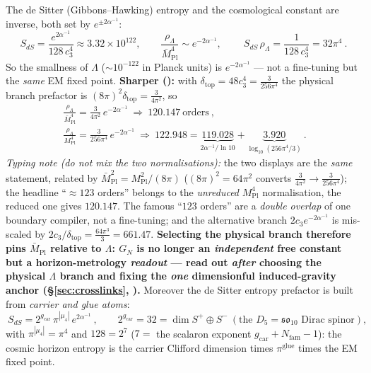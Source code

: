 \documentclass[11pt,a4paper]{article}
\newcommand{\cthree}{c_3}
\newcommand{\gcar}{g_{\mathrm{car}}}
\newcommand{\Nfam}{N_{\mathrm{fam}}}
\newcommand{\ainv}{\alpha^{-1}}
\begin{document}
\begin{keybox}
The de Sitter (Gibbons--Hawking) entropy and the cosmological constant are inverse, both set by
$e^{\pm2\ainv}$:
\[
  S_{dS}=\frac{e^{2\ainv}}{128\,\cthree^4}\approx3.32\times10^{122},\qquad
  \frac{\rho_\Lambda}{\bar M_{\mathrm{Pl}}^4}\sim e^{-2\ainv},\qquad
  \boxed{\ S_{dS}\,\rho_\Lambda=\frac{1}{128\,\cthree^4}=32\pi^4\ }.
\]
So the smallness of $\Lambda$ ($\sim10^{-122}$ in Planck units) is $e^{-2\ainv}$ --- not a fine-tuning but
the \emph{same} EM fixed point. \textbf{Sharper ():} with
$\delta_{\mathrm{top}}=48\cthree^4=\tfrac{3}{256\pi^4}$ the physical branch prefactor is
$(8\pi)^2\delta_{\mathrm{top}}=\tfrac{3}{4\pi^2}$, so
\begin{gather*}
  \boxed{\ \frac{\rho_\Lambda}{\bar M_{\mathrm{Pl}}^4}=\frac{3}{4\pi^2}\,e^{-2\ainv}\ \Rightarrow\ 120.147\ \text{orders}\ },\\[2pt]
  \boxed{\ \frac{\rho_\Lambda}{M_{\mathrm{Pl}}^4}=\frac{3}{256\pi^4}\,e^{-2\ainv}\ \Rightarrow\
  122.948=\underbrace{119.028}_{2\ainv/\ln10}+\underbrace{3.920}_{\log_{10}(256\pi^4/3)}\ }.
\end{gather*}
\emph{Typing note (do not mix the two normalisations):} the two displays are the \emph{same} statement,
related by $\bar M_{\mathrm{Pl}}^2=M_{\mathrm{Pl}}^2/(8\pi)$ ($(8\pi)^2=64\pi^2$ converts
$\tfrac3{4\pi^2}\to\tfrac3{256\pi^4}$); the headline ``$\approx123$ orders'' belongs to the
\emph{unreduced} $M_{\mathrm{Pl}}^4$ normalisation, the reduced one gives $120.147$.
The famous ``$123$ orders'' are a \emph{double overlap} of one boundary compiler, not a fine-tuning; and the
alternative branch $2\cthree e^{-2\ainv}$ is mis-scaled by $2\cthree/\delta_{\mathrm{top}}=\tfrac{64\pi^3}{3}=661.47$.
\textbf{Selecting the physical branch therefore pins $\bar M_{\mathrm{Pl}}$ relative to $\Lambda$: $G_N$ is no
longer an \emph{independent} free constant but a horizon-metrology \emph{readout} --- read out \emph{after}
choosing the physical $\Lambda$ branch and fixing the \emph{one} dimensionful induced-gravity anchor
(\S\ref{sec:crosslinks}, \veri{v68\_seeley\_dewitt\_residual.py}).} Moreover the de Sitter entropy prefactor is
built from \emph{carrier and glue atoms}:
\[
  \boxed{\ S_{dS}=2^{\gcar}\,\pi^{|\mu_4|}\,e^{2\ainv}\ },\qquad
  2^{\gcar}=32=\dim S^+\!\oplus S^-\ (\text{the }D_5{=}\mathfrak{so}_{10}\text{ Dirac spinor}),
\]
with $\pi^{|\mu_4|}=\pi^4$ and $128=2^7$ ($7=$ the scalaron exponent $\gcar{+}\Nfam{-}1$): the cosmic
horizon entropy is the carrier Clifford dimension times $\pi^{\text{glue}}$ times the EM fixed point.
\end{keybox}
\end{document}
